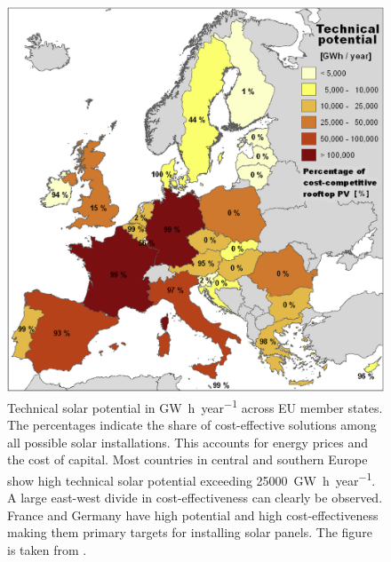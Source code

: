 \documentclass{article} %
\begin{document}
\begin{figure}
	\centering
	\label{fig:map}
	\caption{Technical solar potential in \si{\giga\watt\hour\per year} across EU member states. The percentages indicate the share of cost-effective solutions among all possible solar installations. This accounts for energy prices and the cost of capital. Most countries in central and southern Europe show high technical solar potential exceeding \SI{25000}{\giga\watt\hour\per year}. A large east-west divide in cost-effectiveness can clearly be observed. France and Germany have high potential and high cost-effectiveness making them primary targets for installing solar panels. The figure is taken from \citet{bodis2019high}.}
	\includegraphics[width=0.7\linewidth]{../figures/technical_potential_eu.jpg}
\end{figure}
\end{document}
